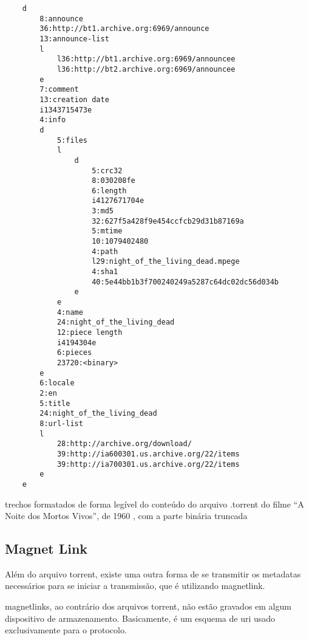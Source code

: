 \begin{listing}[H]
    \begin{verbatim}
    d
        8:announce
        36:http://bt1.archive.org:6969/announce
        13:announce-list
        l
            l36:http://bt1.archive.org:6969/announcee
            l36:http://bt2.archive.org:6969/announcee
        e
        7:comment
        13:creation date
        i1343715473e
        4:info
        d
            5:files
            l
                d
                    5:crc32
                    8:030208fe
                    6:length
                    i4127671704e
                    3:md5
                    32:627f5a428f9e454ccfcb29d31b87169a
                    5:mtime
                    10:1079402480
                    4:path
                    l29:night_of_the_living_dead.mpege
                    4:sha1
                    40:5e44bb1b3f700240249a5287c64dc02dc56d034b
                e
            e
            4:name
            24:night_of_the_living_dead
            12:piece length
            i4194304e
            6:pieces
            23720:<binary>
        e
        6:locale
        2:en
        5:title
        24:night_of_the_living_dead
        8:url-list
        l
            28:http://archive.org/download/
            39:http://ia600301.us.archive.org/22/items
            39:http://ia700301.us.archive.org/22/items
        e
    e
    \end{verbatim}
    \caption{trechos formatados de forma legível do conteúdo do arquivo .torrent do
    filme ``A Noite dos Mortos Vivos'', de 1960 \cite{torrent-file}, com a parte
    binária truncada}
    \label{lst:torrent-file-code}
\end{listing}

\subsection*{Magnet Link}

Além do arquivo \gls*{torrent}, existe uma outra forma de se transmitir os
\glspl*{metadata} necessários para se iniciar a transmissão, que é utilizando
\gls{magnetlink}.

\Glspl*{magnetlink}, ao contrário dos arquivos \gls*{torrent}, não estão gravados em
algum dispositivo de armazenamento. Basicamente, é um esquema de \gls{uri} usado
exclusivamente para o protocolo.

